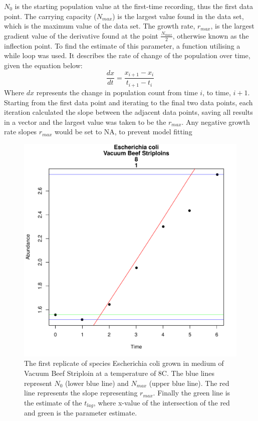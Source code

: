\documentclass[11pt]{article}
\begin{document}
$N_0$ is the starting population value at the first-time recording, thus the first data point. The carrying capacity ($N_{max}$) is the largest value found in the data set, which is the maximum value of the data set. The growth rate, $r_{max}$, is the largest gradient value of the derivative found at the point $\frac{N_{max}}{2}$, otherwise known as the inflection point. To find the estimate of this parameter, a function utilising a while loop was used. It describes the rate of change of the population over time, given the equation below:
\begin{equation*}
    \frac{dx}{dt}=\frac{x_{i+1}-x_{i}}{t_{i+1}-t_{i}}\label{eq:slope} \tag{4}
\end{equation*}
Where $dx$ represents the change in population count from time $i$, to time, $i+1$. Starting from the first data point and iterating to the final two data points, each iteration calculated the slope between the adjacent data points, saving all results in a vector and the largest value was taken to be the $r_{max}$. Any negative growth rate slopes $r_{max}$ would be set to NA, to prevent model fitting
\begin{figure}[h]
\centering
\includegraphics[scale=0.5]{../Results/Parameters_Ecoli.pdf}
\caption{The first replicate of species Escherichia coli grown in medium of Vacuum Beef Striploin at a temperature of 8\degree C. The blue lines represent $N_0$ (lower blue line) and $N_{max}$ (upper blue line). The red line represents the slope representing $r_{max}$. Finally the green line is the estimate of the $t_{lag}$, where x-value of the intersection of the red and green is the parameter estimate.}
\label{fig:Starting parameters}
\end{figure}
\end{document}
